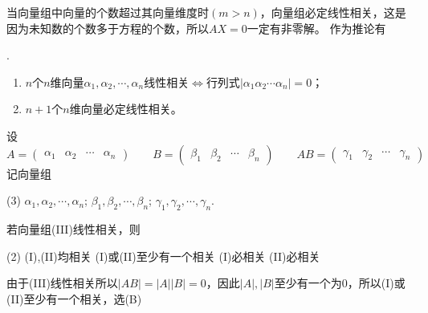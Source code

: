 当向量组中向量的个数超过其向量维度时$(m>n)$，向量组必定线性相关，这是因为未知数的个数多于方程的个数，所以$AX=0$一定有非零解。
作为推论有
\begin{theorem}
    .
    \begin{enumerate}[(1)]
        \item $n$个$n$维向量$\alpha_1,\alpha_2,\cdots,\alpha_n$线性相关$\iff$行列式$|\alpha_1 \alpha_2 \cdots \alpha_n|=0$；
        \item $n+1$个$n$维向量必定线性相关。
    \end{enumerate}
\end{theorem}
\begin{example}
    设
    \[
        A =
        \begin{pmatrix}
            \alpha_1 & \alpha_2 & \cdots & \alpha_n
        \end{pmatrix}
        \qquad
        B =
        \begin{pmatrix}
            \beta_1 & \beta_2 & \cdots & \beta_n
        \end{pmatrix}
        \qquad
        AB =
        \begin{pmatrix}
            \gamma_1 & \gamma_2 & \cdots & \gamma_n
        \end{pmatrix}
    \]
    记向量组
    \begin{tasks}[label=(\Roman*),label-width = 2em](3)
        \task $\alpha_1,\alpha_2,\cdots,\alpha_n$;
        \task $\beta_1,\beta_2,\cdots,\beta_n$;
        \task $\gamma_1,\gamma_2,\cdots,\gamma_n$.
    \end{tasks}
    若向量组(III)线性相关，则
    \begin{tasks}[label=(\Alph*),label-width = 2em](2)
        \task (I),(II)均相关
        \task (I)或(II)至少有一个相关
        \task (I)必相关
        \task (II)必相关
    \end{tasks}
\end{example}
\begin{solution}
    由于(III)线性相关所以$|AB|=|A||B|=0$，因此$|A|,|B|$至少有一个为$0$，所以(I)或(II)至少有一个相关，选(B)
\end{solution}

